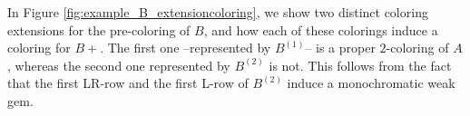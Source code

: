 \documentclass[12pt]{book}
\theoremstyle{plain}
\theoremstyle{remark}
\begin{document}
In Figure \ref{fig:example_B_extensioncoloring}, we show two distinct coloring extensions for the pre-coloring of $B$, and how each of these colorings induce a coloring for $B+$. The first one --represented by $B^{(1)}$-- is a proper $2$-coloring of $A$, whereas the second one represented by $B^{(2)}$ is not. This follows from the fact that the first LR-row and the first L-row of $B^{(2)}$ induce a monochromatic weak gem.
 
\end{document}
